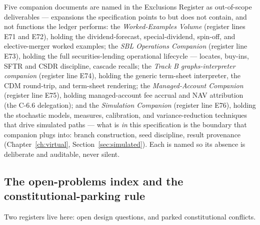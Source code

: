 Five companion documents are named in the Exclusions Register as out-of-scope
deliverables --- expansions the specification points to but does not contain, and not
functions the ledger performs: the \emph{Worked-Examples Volume} (register lines E71 and
E72), holding the dividend-forecast, special-dividend, spin-off, and elective-merger
worked examples; the \emph{SBL Operations Companion} (register line E73), holding the full
securities-lending operational lifecycle --- locates, buy-ins, SFTR and CSDR discipline,
cascade recalls; the \emph{Track B graphs-interpreter companion} (register line E74),
holding the generic term-sheet interpreter, the CDM round-trip, and term-sheet rendering;
the \emph{Managed-Account Companion} (register line E75), holding managed-account fee
accrual and NAV attribution (the C-6.6 delegation); and the \emph{Simulation Companion}
(register line E76), holding the stochastic models, measures, calibration, and
variance-reduction techniques that drive simulated paths --- what is \emph{in} this
specification is the boundary that companion plugs into: branch construction, seed
discipline, result provenance (Chapter~\ref{ch:virtual}, Section~\ref{sec:simulated}).
Each is named so its absence is deliberate and auditable, never silent.

\subsection{The open-problems index and the constitutional-parking rule}

Two registers live here: open design questions, and parked constitutional conflicts.

